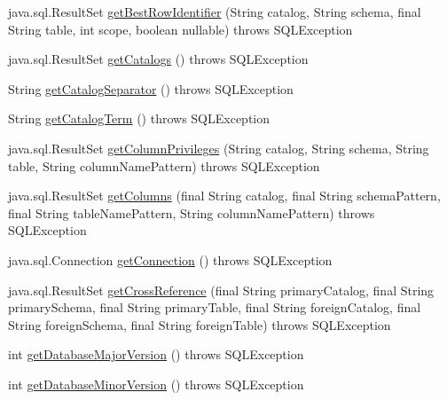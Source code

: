 \begin{DoxyCompactItemize}
\item 
java.\+sql.\+Result\+Set \mbox{\hyperlink{classcom_1_1mysql_1_1cj_1_1jdbc_1_1_database_meta_data_acc39ad8d7dccb11a125dfe2077a06692}{get\+Best\+Row\+Identifier}} (String catalog, String schema, final String table, int scope, boolean nullable)  throws S\+Q\+L\+Exception 
\item 
java.\+sql.\+Result\+Set \mbox{\hyperlink{classcom_1_1mysql_1_1cj_1_1jdbc_1_1_database_meta_data_a9c17d2d6c3e0b7a464e34c01937f7a0f}{get\+Catalogs}} ()  throws S\+Q\+L\+Exception 
\item 
String \mbox{\hyperlink{classcom_1_1mysql_1_1cj_1_1jdbc_1_1_database_meta_data_a47550adf181d0dec4658e1936cdf8090}{get\+Catalog\+Separator}} ()  throws S\+Q\+L\+Exception 
\item 
String \mbox{\hyperlink{classcom_1_1mysql_1_1cj_1_1jdbc_1_1_database_meta_data_a86cc7765062731005a70dcfae06fd305}{get\+Catalog\+Term}} ()  throws S\+Q\+L\+Exception 
\item 
java.\+sql.\+Result\+Set \mbox{\hyperlink{classcom_1_1mysql_1_1cj_1_1jdbc_1_1_database_meta_data_affd90a096e1d4a31979b1818bd26b557}{get\+Column\+Privileges}} (String catalog, String schema, String table, String column\+Name\+Pattern)  throws S\+Q\+L\+Exception 
\item 
java.\+sql.\+Result\+Set \mbox{\hyperlink{classcom_1_1mysql_1_1cj_1_1jdbc_1_1_database_meta_data_a2f3d1ef210e9e6b2f422bbb5242b56ed}{get\+Columns}} (final String catalog, final String schema\+Pattern, final String table\+Name\+Pattern, String column\+Name\+Pattern)  throws S\+Q\+L\+Exception 
\item 
java.\+sql.\+Connection \mbox{\hyperlink{classcom_1_1mysql_1_1cj_1_1jdbc_1_1_database_meta_data_aa00cb034e4f6ccbf51eb76593c9cf6e2}{get\+Connection}} ()  throws S\+Q\+L\+Exception 
\item 
java.\+sql.\+Result\+Set \mbox{\hyperlink{classcom_1_1mysql_1_1cj_1_1jdbc_1_1_database_meta_data_a5542eb619f90b95f2cc8418c8b61bb67}{get\+Cross\+Reference}} (final String primary\+Catalog, final String primary\+Schema, final String primary\+Table, final String foreign\+Catalog, final String foreign\+Schema, final String foreign\+Table)  throws S\+Q\+L\+Exception 
\item 
int \mbox{\hyperlink{classcom_1_1mysql_1_1cj_1_1jdbc_1_1_database_meta_data_a8e1f681921cbbfb258610a72cfb2d50d}{get\+Database\+Major\+Version}} ()  throws S\+Q\+L\+Exception 
\item 
int \mbox{\hyperlink{classcom_1_1mysql_1_1cj_1_1jdbc_1_1_database_meta_data_afbf2d253f3c8bef74398a609b843526a}{get\+Database\+Minor\+Version}} ()  throws S\+Q\+L\+Exception 

\end{DoxyCompactItemize}
